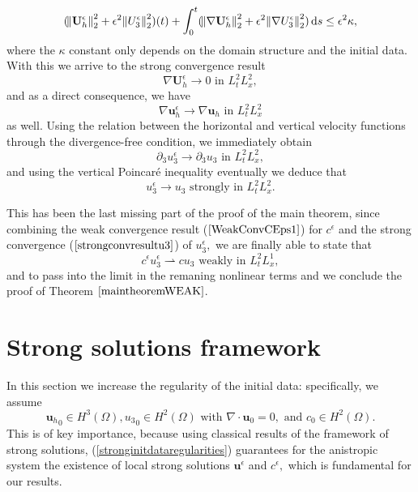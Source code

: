 \documentclass[11pt, a4paper]{article}
\newcommand*\diff{\mathop{}\!\mathrm{d}}
\begin{document}
$$ (\norm{\mathbf{U}_h^\epsilon}_2^2 + \epsilon^2 \norm{U_3^\epsilon}_2^2)(t) + \int_0^t (\norm{\nabla \mathbf{U}_h^\epsilon}_2^2 + \epsilon^2 \norm{\nabla U_3^\epsilon}_2^2) \diff s \leq \epsilon^2 \kappa,$$
where the $\kappa$ constant only depends on the domain structure and the initial data. With this we arrive to the strong convergence result $$\nabla \mathbf{U}_h^\epsilon \to 0 \text{ in } L^2_t L^2_x,$$ and as a direct consequence, we have 
$$\nabla \mathbf{u}_h^\epsilon \to \nabla \mathbf{u}_h \text{ in } L^2_t L^2_x$$ 
as well. Using the relation between the horizontal and vertical velocity functions through the divergence-free condition, we immediately obtain $$\partial_3 u_3^\epsilon \to \partial_3 u_3 \text{ in } L^2_t L^2_x,$$ and using the vertical Poincar\'e inequality eventually we deduce that
\begin{equation}
\label{strongconvresultu3}u_3^\epsilon \to u_3 \text{ strongly in } L^2_t L^2_x.
\end{equation}

This has been the last missing part of the proof of the main theorem, since combining the weak convergence result ($\ref{WeakConvCEps1}$) for $c^\epsilon$ and the strong convergence ($\ref{strongconvresultu3}$) of $u_3^\epsilon,$ we are finally able to state that
%
\begin{equation}c^\epsilon u_3^\epsilon \rightharpoonup c u_3 \text{ weakly in } L_t^2 L_x^1,\end{equation}
%
and to pass into the limit in the remaning nonlinear terms and we  conclude the proof of Theorem $\ref{maintheoremWEAK}$.

\section{Strong solutions framework} \label{sectionSTRONGsol}

In this section we increase the regularity of the initial data: specifically, we assume \begin{equation}\label{stronginitdataregularities}{\mathbf{u}_h}_0 \in H^3(\Omega), {u_3}_0 \in H^2(\Omega) \text{ with } \nabla \cdot \mathbf{u}_0 = 0, \text{ and } c_0 \in H^2 (\Omega).\end{equation} This is of key importance, because using classical results of the framework of strong solutions, (\ref{stronginitdataregularities}) guarantees for the anistropic system the existence of local strong solutions $\mathbf{u}^\epsilon$ and $c^\epsilon,$  which is fundamental for our results.
\end{document}
